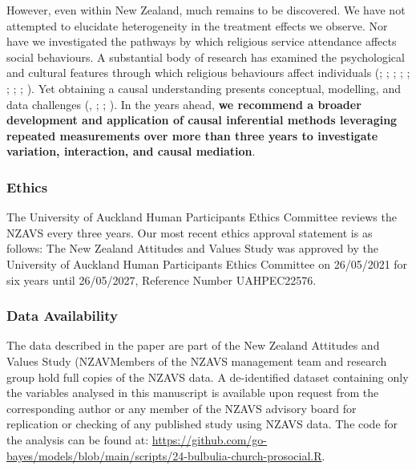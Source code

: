 \documentclass[
  single column]{article}
\begin{document}
However, even within New Zealand, much remains to be discovered. We have
not attempted to elucidate heterogeneity in the treatment effects we
observe. Nor have we investigated the pathways by which religious
service attendance affects social behaviours. A substantial body of
research has examined the psychological and cultural features through
which religious behaviours affect individuals
(;
; ;
;
;
;
;
; ). Yet obtaining a causal understanding presents
conceptual, modelling, and data challenges
(,
; ; ). In
the years ahead, \textbf{we recommend a broader development and
application of causal inferential methods leveraging repeated
measurements over more than three years to investigate variation,
interaction, and causal mediation}.

\newpage{}

\subsubsection{Ethics}\label{ethics}

The University of Auckland Human Participants Ethics Committee reviews
the NZAVS every three years. Our most recent ethics approval statement
is as follows: The New Zealand Attitudes and Values Study was approved
by the University of Auckland Human Participants Ethics Committee on
26/05/2021 for six years until 26/05/2027, Reference Number UAHPEC22576.

\subsubsection{Data Availability}\label{data-availability}

The data described in the paper are part of the New Zealand Attitudes
and Values Study (NZAVMembers of the NZAVS management team and research
group hold full copies of the NZAVS data. A de-identified dataset
containing only the variables analysed in this manuscript is available
upon request from the corresponding author or any member of the NZAVS
advisory board for replication or checking of any published study using
NZAVS data. The code for the analysis can be found at:
\url{https://github.com/go-bayes/models/blob/main/scripts/24-bulbulia-church-prosocial.R}.
\end{document}
